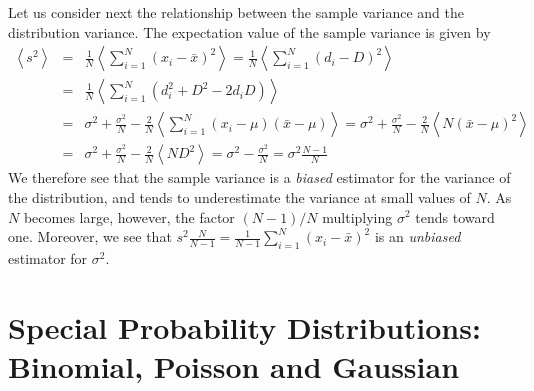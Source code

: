 \documentclass{revtex4}
\begin{document}
Let us consider next the relationship between the sample variance and
the distribution variance. The
expectation value of the sample variance is given by
\begin{eqnarray}
  \left<s^2 \right> &=& \frac{1}{N} \left<\sum_{i=1}^N (x_i -
    \bar{x})^2 \right> = \frac{1}{N} \left<\sum_{i=1}^N (d_i -D)^2
  \right> \nonumber \\
  &=& \frac{1}{N} \left<\sum_{i=1}^N \left( d_i^2 + D^2 - 2d_i D
    \right)\right> \nonumber \\
  &=& \sigma^2 + \frac{\sigma^2}{N} - \frac{2}{N} \left<\sum_{i=1}^N
    (x_i-\mu)(\bar{x}-\mu)\right> = \sigma^2 + \frac{\sigma^2}{N} -
  \frac{2}{N} \left<N (\bar{x}-\mu)^2 \right> \nonumber \\
  &=& \sigma^2 + \frac{\sigma^2}{N} - \frac{2}{N}\left<N D^2 \right> =
  \sigma^2 - \frac{\sigma^2}{N} = \sigma^2 \frac{N-1}{N} 
\end{eqnarray}
We therefore see that the sample variance is a \emph{biased} estimator for the
variance of the distribution, and tends to underestimate the variance
at small values of $N$. As $N$ becomes large, however, the factor
$(N-1)/N$ multiplying $\sigma^2$ tends toward one. Moreover, we see
that $s^2 \frac{N}{N-1} = \frac{1}{N-1}\sum_{i=1}^N (x_i - \bar{x})^2$
is an \emph{unbiased} estimator for $\sigma^2$.
\section{Special Probability Distributions: Binomial, Poisson and
  Gaussian}
\end{document}
